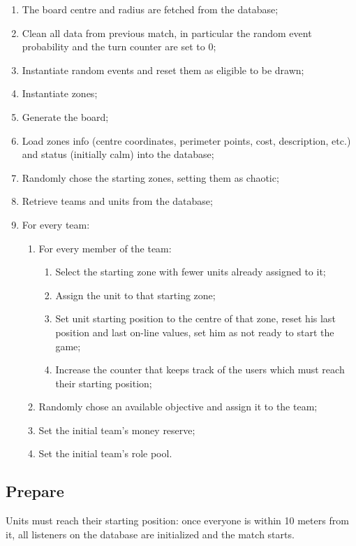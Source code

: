 			\begin{enumerate}
				\item The board centre and radius are fetched from the database;
				\item Clean all data from previous match, in particular the random event probability and the turn counter are set to 0;
				\item Instantiate random events and reset them as eligible to be drawn;
				\item Instantiate zones;
				\item Generate the board;
				\item Load zones info (centre coordinates, perimeter points, cost, description, etc.) and status (initially calm) into the database;
				\item Randomly chose the starting zones, setting them as chaotic;
				\item Retrieve teams and units from the database;
				\item For every team: 
				\begin{enumerate}					
					\item For every member of the team:
					\begin{enumerate}
						\item Select the starting zone with fewer units already assigned to it;
						\item Assign the unit to that starting zone;
						\item Set unit starting position to the centre of that zone, reset his last position and last on-line values, set him as not ready to start the game;
						\item Increase the counter that keeps track of the users which must reach their starting position;
					\end{enumerate}
					\item Randomly chose an available objective and assign it to the team;
					\item Set the initial team's money reserve;
					\item Set the initial team's role pool.
				\end{enumerate}
			\end{enumerate}
		
		\subsection{Prepare}
		
			Units must reach their starting position: once everyone is within 10 meters from it, all listeners on the database are initialized and the match starts.
		
